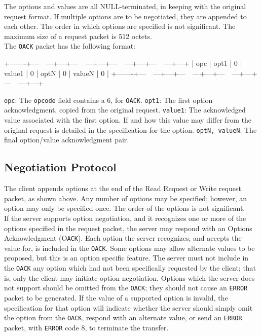 \documentclass[12pt]{article}
\begin{document}
The options and values are all NULL-terminated, in keeping with the original request format. If multiple options are to be negotiated, they are appended to each other. The order in which options are specified is not significant. The maximum size of a request packet is 512 octets.\\

The \verb|OACK| packet has the following format:

   +-------+---~~---+---+---~~---+---+---~~---+---+---~~---+---+
   | opc | opt1 | 0 | value1 | 0 | optN | 0 | valueN | 0 |
   +-------+---~~---+---+---~~---+---+---~~---+---+---~~---+---+
\begin{itemize}
\verb|opc|: The \verb|opcode| field contains a 6, for \verb|OACK|.
\verb|opt1|: The first option acknowledgment, copied from the original request.
\verb|value1|: The acknowledged value associated with the first option. If and how this value may differ from the original request is detailed in the specification for the option.
\verb|optN, valueN|: The final option/value acknowledgment pair.
\end{itemize}

\subsection{Negotiation Protocol}
The client appends options at the end of the Read Request or Write request packet, as shown above. Any number of options may be specified; however, an option may only be specified once. The order of the options is not significant.\\

If the server supports option negotiation, and it recognizes one or more of the options specified in the request packet, the server may respond with an Options Acknowledgment (O\verb|ACK|). Each option the server recognizes, and accepts the value for, is included in the \verb|OACK|. Some options may allow alternate values to be proposed, but this is an option specific feature. The server must not include in the \verb|OACK| any option which had not been specifically requested by the client; that is, only the client may initiate option negotiation. Options which the server does not support should be omitted from the \verb|OACK|; they should not cause an  \verb|ERROR| packet to be generated. If the value of a supported option is invalid, the specification for that option will indicate whether the server should simply omit the option from the \verb|OACK|, respond with an alternate value, or send an \verb|ERROR|
packet, with  \verb|ERROR| code 8, to terminate the transfer.\\
\end{document}
